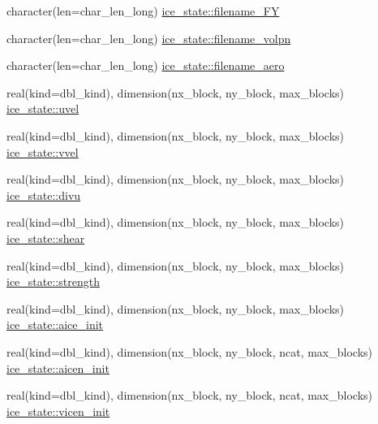 \begin{DoxyCompactItemize}
\item 
character(len=char\_\-len\_\-long) \hyperlink{namespaceice__state_ab81811ccfe7c4d81a224263818d7622a}{ice\_\-state::filename\_\-FY}
\item 
character(len=char\_\-len\_\-long) \hyperlink{namespaceice__state_a56846a6e162a564a78e7ad6d8103aa19}{ice\_\-state::filename\_\-volpn}
\item 
character(len=char\_\-len\_\-long) \hyperlink{namespaceice__state_ab5f78ad535732539802475cc958d8bc0}{ice\_\-state::filename\_\-aero}
\item 
real(kind=dbl\_\-kind), dimension(nx\_\-block, ny\_\-block, max\_\-blocks) \hyperlink{namespaceice__state_a74f862ad20a4ee9051006a6db77c4bc5}{ice\_\-state::uvel}
\item 
real(kind=dbl\_\-kind), dimension(nx\_\-block, ny\_\-block, max\_\-blocks) \hyperlink{namespaceice__state_ae19e42c4089f6a3a8426fb5847cf748e}{ice\_\-state::vvel}
\item 
real(kind=dbl\_\-kind), dimension(nx\_\-block, ny\_\-block, max\_\-blocks) \hyperlink{namespaceice__state_a1d4ddf61ed16b9ab3bf546bfb006628b}{ice\_\-state::divu}
\item 
real(kind=dbl\_\-kind), dimension(nx\_\-block, ny\_\-block, max\_\-blocks) \hyperlink{namespaceice__state_aac4fe23f1dbcb435f711d8446d83dcca}{ice\_\-state::shear}
\item 
real(kind=dbl\_\-kind), dimension(nx\_\-block, ny\_\-block, max\_\-blocks) \hyperlink{namespaceice__state_a4f093119aa04b4e413418f77e12f0cf6}{ice\_\-state::strength}
\item 
real(kind=dbl\_\-kind), dimension(nx\_\-block, ny\_\-block, max\_\-blocks) \hyperlink{namespaceice__state_a02c92db0074e9bcdb95221ca85472f20}{ice\_\-state::aice\_\-init}
\item 
real(kind=dbl\_\-kind), dimension(nx\_\-block, ny\_\-block, ncat, max\_\-blocks) \hyperlink{namespaceice__state_abbaa812633c91cc57a5bad8a2b43920a}{ice\_\-state::aicen\_\-init}
\item 
real(kind=dbl\_\-kind), dimension(nx\_\-block, ny\_\-block, ncat, max\_\-blocks) \hyperlink{namespaceice__state_ac5cee5fad34f6b73399069dda488adab}{ice\_\-state::vicen\_\-init}
\end{DoxyCompactItemize}
